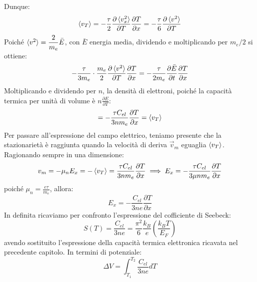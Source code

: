 \documentclass{book}
\begin{document}
            Dunque:
            $$\braket{v_{T}} = -\frac{\tau}{2} \frac{\partial \braket{v_{x} ^{2}}}{\partial T} \frac{\partial T}{\partial x} = - \frac{\tau}{6} \frac{\partial \braket{v ^{2}}}{\partial T}$$
            Poiché $\braket{v^{2}} = \displaystyle  \frac{2}{m_{e}} \bar{E}$, con $\bar{E}$ energia media, dividendo e moltiplicando per $m_{e}/2$ si ottiene:
            $$-\frac{\tau}{3m_{e}} \cdot \frac{m_{e}}{2} \frac{\partial \braket{v^{2}}}{\partial T} \frac{\partial T}{\partial x} = - \frac{\tau}{2m_{e}} \frac{\partial \bar{E}}{\partial t} \frac{\partial T}{\partial x}$$
            Moltiplicando e dividendo per $n$, la densità di elettroni, poiché la capacità termica per unità di volume è $\displaystyle n \frac{\partial E}{\partial T}$:
            $$= - \frac{\tau C_{el}}{3n m_{e}} \frac{\partial T}{\partial x} = \braket{v_{T}}$$
            Per passare all'espressione del campo elettrico, teniamo presente che la stazionarietà è raggiunta quando la velocità di deriva $\vec{v}_{m}$ eguaglia $\braket{v_{T}}$. Ragionando sempre in una dimensione:
            $$v_{m} = - \mu_{n}E_{x} = -\braket{v_{T}} = \frac{\tau C_{el}}{3nm_{e}}\frac{\partial T}{\partial x} \implies E_{x} = - \frac{\tau  C_{el}}{3\mu n m_{e}} \frac{\partial T}{\partial x}$$
            poiché $\displaystyle \mu_{n} = \frac{e \tau}{m_{e}}$, allora:
            $$E_{x} = - \frac{C_{el}}{3ne} \frac{\partial T}{\partial x}$$
            In definita ricaviamo per confronto l'espressione del cofficiente di Seebeck:
            $$S(T) = \frac{C_{el}}{3ne} = \frac{\pi^{2}}{6} \frac{k_{B}}{e} (\frac{k_{B}T}{E_{F}})$$
            avendo sostituito l'espressione della capacità termica elettronica ricavata nel precedente capitolo. In termini di potenziale:
            $$\Delta V = \int_{T_{1}} ^{T_{2}} \frac{C_{el}}{3ne} dT$$
\end{document}
